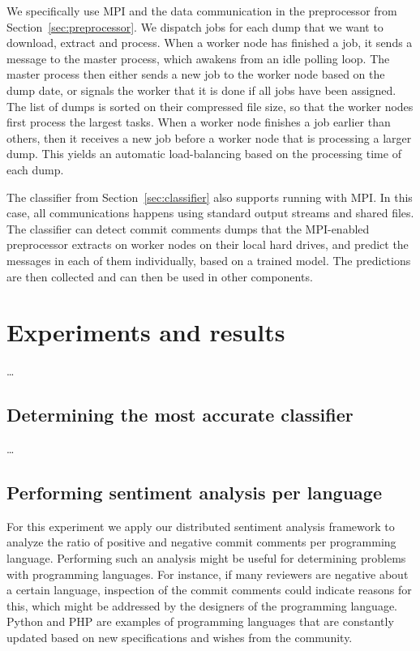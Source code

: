 \documentclass{article}
\begin{document}
We specifically use MPI and the data communication in the preprocessor from 
Section~\ref{sec:preprocessor}. We dispatch jobs for each dump that we want to 
download, extract and process. When a worker node has finished a job, it sends 
a message to the master process, which awakens from an idle polling loop. The 
master process then either sends a new job to the worker node based on the dump 
date, or signals the worker that it is done if all jobs have been assigned. The 
list of dumps is sorted on their compressed file size, so that the worker nodes 
first process the largest tasks. When a worker node finishes a job earlier than 
others, then it receives a new job before a worker node that is processing a
larger dump. This yields an automatic load-balancing based on the processing
time of each dump.

The classifier from Section~\ref{sec:classifier} also supports running with 
MPI\@. In this case, all communications happens using standard output streams
and shared files. The classifier can detect commit comments dumps that the 
MPI-enabled preprocessor extracts on worker nodes on their local hard drives, 
and predict the messages in each of them individually, based on a trained 
model. The predictions are then collected and can then be used in other 
components.

\section{Experiments and results}\label{sec:experiments-and-results}
\ldots

\subsection{Determining the most accurate classifier}\label{sec:most-accurate-classifier}
\ldots

\subsection{Performing sentiment analysis per language}\label{sec:sentiment-analysis-per-language}
For this experiment we apply our distributed sentiment analysis framework to
analyze the ratio of positive and negative commit comments per programming
language. Performing such an analysis might be useful for determining problems
with programming languages. For instance, if many reviewers are negative about
a certain language, inspection of the commit comments could indicate reasons
for this, which might be addressed by the designers of the programming
language. Python and PHP are examples of programming languages that are
constantly updated based on new specifications and wishes from the community.
\end{document}
